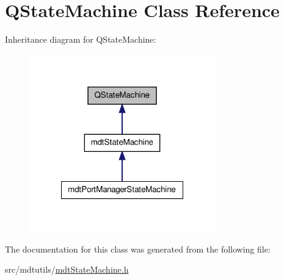 \hypertarget{class_q_state_machine}{\section{Q\-State\-Machine Class Reference}
\label{class_q_state_machine}
}


Inheritance diagram for Q\-State\-Machine\-:\nopagebreak
\begin{figure}[H]
\begin{center}
\leavevmode
\includegraphics[width=228pt]{class_q_state_machine__inherit__graph}
\end{center}
\end{figure}


The documentation for this class was generated from the following file\-:\begin{DoxyCompactItemize}
\item 
src/mdtutils/\hyperlink{mdt_state_machine_8h}{mdt\-State\-Machine.\-h}\end{DoxyCompactItemize}
